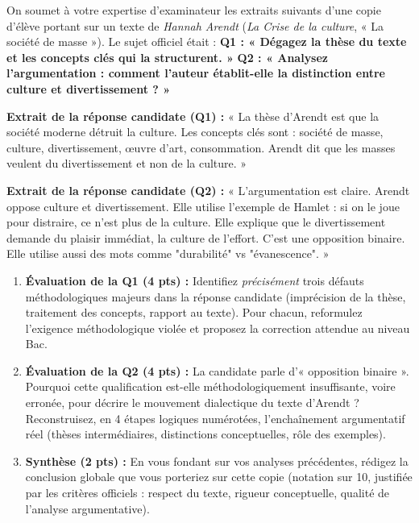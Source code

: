 \documentclass[11pt]{article}
\begin{document}
\begin{exercice}
On soumet à votre expertise d'examinateur les extraits suivants d'une copie d'élève portant sur un texte de \textit{Hannah Arendt} (\textit{La Crise de la culture}, « La société de masse »). Le sujet officiel était : \textbf{Q1 : « Dégagez la thèse du texte et les concepts clés qui la structurent. »} \textbf{Q2 : « Analysez l'argumentation : comment l'auteur établit-elle la distinction entre culture et divertissement ? »}

\textbf{Extrait de la réponse candidate (Q1) :} « La thèse d'Arendt est que la société moderne détruit la culture. Les concepts clés sont : société de masse, culture, divertissement, œuvre d'art, consommation. Arendt dit que les masses veulent du divertissement et non de la culture. »

\textbf{Extrait de la réponse candidate (Q2) :} « L'argumentation est claire. Arendt oppose culture et divertissement. Elle utilise l'exemple de Hamlet : si on le joue pour distraire, ce n'est plus de la culture. Elle explique que le divertissement demande du plaisir immédiat, la culture de l'effort. C'est une opposition binaire. Elle utilise aussi des mots comme "durabilité" vs "évanescence". »

\begin{enumerate}
    \item \textbf{Évaluation de la Q1 (4 pts) :} Identifiez \textit{précisément} trois défauts méthodologiques majeurs dans la réponse candidate (imprécision de la thèse, traitement des concepts, rapport au texte). Pour chacun, reformulez l'exigence méthodologique violée et proposez la correction attendue au niveau Bac.
    \item \textbf{Évaluation de la Q2 (4 pts) :} La candidate parle d'« opposition binaire ». Pourquoi cette qualification est-elle méthodologiquement insuffisante, voire erronée, pour décrire le mouvement dialectique du texte d'Arendt ? Reconstruisez, en 4 étapes logiques numérotées, l'enchaînement argumentatif réel (thèses intermédiaires, distinctions conceptuelles, rôle des exemples).
    \item \textbf{Synthèse (2 pts) :} En vous fondant sur vos analyses précédentes, rédigez la conclusion globale que vous porteriez sur cette copie (notation sur 10, justifiée par les critères officiels : respect du texte, rigueur conceptuelle, qualité de l'analyse argumentative).
\end{enumerate}
\end{exercice}
\end{document}
